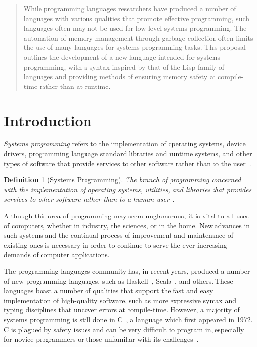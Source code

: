 \documentclass[11pt]{article}
\theoremstyle{break}
\newtheorem{defn}{Definition}
\begin{document}
\begin{quote}
While programming languages researchers have produced a number of languages with various qualities that promote effective programming, such languages often may not be used for low-level systems programming. The automation of memory management through garbage collection often limits the use of many languages for systems programming tasks. This proposal outlines the development of a new language intended for systems programming, with a syntax inspired by that of the Lisp family of languages and providing methods of ensuring memory safety at compile-time rather than at runtime.
\end{quote}

\section{Introduction}
\label{sec:introduction}
\vspace*{-.1in}

\textit{Systems programming} refers to the implementation of operating systems, device drivers, programming language standard libraries and runtime systems, and other types of software that provide services to other software rather than to the user~\cite{Narten:2003:SP:1074100.1074850,Shapiro:2006:PLC:1215995.1216004}.

\begin{defn}[Systems Programming]
The branch of programming concerned with the implementation of operating systems, utilities, and libraries that provides services to other software rather than to a human user~\cite{Narten:2003:SP:1074100.1074850}.
\end{defn}

Although this area of programming may seem unglamorous, it is vital to all uses of computers, whether in industry, the sciences, or in the home. New advances in such systems and the continual process of improvement and maintenance of existing ones is necessary in order to continue to serve the ever increasing demands of computer applications.

The programming languages community has, in recent years, produced a number of new programming languages, such as Haskell~\cite{jones2003haskell,hudak1992report}, Scala~\cite{odersky2004scala,odersky2004overview}, and others. These languages boast a number of qualities that support the fast and easy implementation of high-quality software, such as more expressive syntax and typing disciplines that uncover errors at compile-time. However, a majority of systems programming is still done in C~\cite{kernighan1988c}, a language which first appeared in 1972. C is plagued by safety issues and can be very difficult to program in, especially for novice programmers or those unfamiliar with its challenges~\cite{Shapiro:2006:PLC:1215995.1216004,Ray:2014:LSS:2635868.2635922,Bhattacharya:2011:APL:1985793.1985817}.
\end{document}
